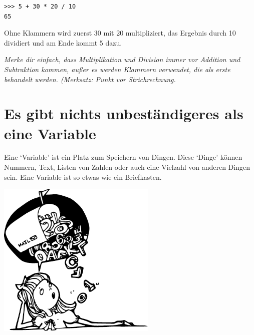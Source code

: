 \begin{Verbatim}[frame=single]
>>> 5 + 30 * 20 / 10
65
\end{Verbatim}

Ohne Klammern wird zuerst 30 mit 20 multipliziert, das Ergebnis durch 10 dividiert und am Ende kommt 5 dazu.

\emph{Merke dir einfach, dass Multiplikation und Division immer vor Addition und Subtraktion kommen, außer es werden Klammern verwendet, die als erste behandelt werden. (Merksatz: Punkt vor Strichrechnung.}

\section{Es gibt nichts unbeständigeres als eine Variable}

Eine `Variable' ist ein Platz zum Speichern von Dingen. Diese `Dinge' können Nummern, Text, Listen von Zahlen oder auch eine Vielzahl von anderen Dingen sein. Eine Variable ist so etwas wie ein Briefkasten.

\begin{center}
\includegraphics*[width=76mm]{images/girlbubble}
\end{center}

